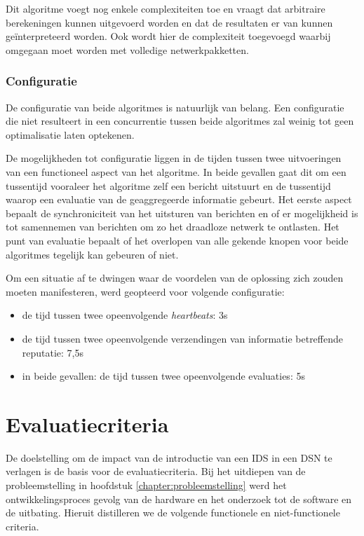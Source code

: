 Dit algoritme voegt nog enkele complexiteiten toe en vraagt dat arbitraire
berekeningen kunnen uitgevoerd worden en dat de resultaten er van kunnen
ge\"interpreteerd worden. Ook wordt hier de complexiteit toegevoegd waarbij
omgegaan moet worden met volledige netwerkpakketten.

\subsubsection{Configuratie}

De configuratie van beide algoritmes is natuurlijk van belang. Een configuratie
die niet resulteert in een concurrentie tussen beide algoritmes zal weinig tot
geen optimalisatie laten optekenen.

De mogelijkheden tot configuratie liggen in de tijden tussen twee uitvoeringen
van een functioneel aspect van het algoritme. In beide gevallen gaat dit om een
tussentijd vooraleer het algoritme zelf een bericht uitstuurt en de tussentijd
waarop een evaluatie van de geaggregeerde informatie gebeurt. Het eerste aspect
bepaalt de synchroniciteit van het uitsturen van berichten en of er
mogelijkheid is tot samennemen van berichten om zo het draadloze netwerk te
ontlasten. Het punt van evaluatie bepaalt of het overlopen van alle gekende
knopen voor beide algoritmes tegelijk kan gebeuren of niet.

Om een situatie af te dwingen waar de voordelen van de oplossing zich zouden
moeten manifesteren, werd geopteerd voor volgende configuratie:

\begin{itemize}

  \item de tijd tussen twee opeenvolgende \emph{heartbeats}: 3s

  \item de tijd tussen twee opeenvolgende verzendingen van informatie
  betreffende reputatie: 7,5s

  \item in beide gevallen: de tijd tussen twee opeenvolgende evaluaties: 5s

\end{itemize}

\section{Evaluatiecriteria}
\label{section:criteria}

De doelstelling om de impact van de introductie van een IDS in een DSN te
verlagen is de basis voor de evaluatiecriteria. Bij het uitdiepen van de
probleemstelling in hoofdstuk \ref{chapter:probleemstelling} werd het
ontwikkelingsproces gevolg van de hardware en het onderzoek tot de software en
de uitbating. Hieruit distilleren we de volgende functionele en
niet-functionele criteria.

